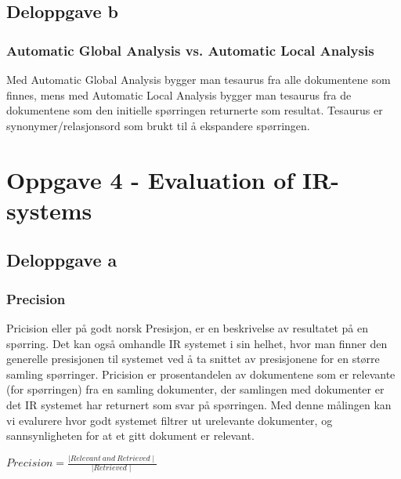 \subsection*{Deloppgave b}

\vspace{3 mm}

\subsubsection*{Automatic Global Analysis vs. Automatic Local Analysis}
Med Automatic Global Analysis bygger man tesaurus fra alle dokumentene som finnes, mens med Automatic Local Analysis bygger man tesaurus fra de dokumentene som den initielle spørringen returnerte som resultat. Tesaurus er synonymer/relasjonsord som brukt til å ekspandere spørringen.

\vspace{6 mm}

\section*{Oppgave 4 - Evaluation of IR-systems}

\subsection*{Deloppgave a}

\vspace{3 mm}

\subsubsection*{Precision}
Pricision eller på godt norsk Presisjon, er en beskrivelse av resultatet på en spørring. Det kan også omhandle IR systemet i sin helhet, hvor man finner den generelle presisjonen til systemet ved å ta snittet av presisjonene for en større samling spørringer. Pricision er prosentandelen av dokumentene som er relevante (for spørringen) fra en samling dokumenter, der samlingen med dokumenter er det IR systemet har returnert som svar på spørringen. Med denne målingen kan vi evalurere hvor godt systemet filtrer ut urelevante dokumenter, og sannsynligheten for at et gitt dokument er relevant.

\vspace{3 mm}

\begin{center}
$Precision = \frac{\mid Relevant \ and \ Retrieved \mid}{\mid Retrieved \mid}$
\end{center}

